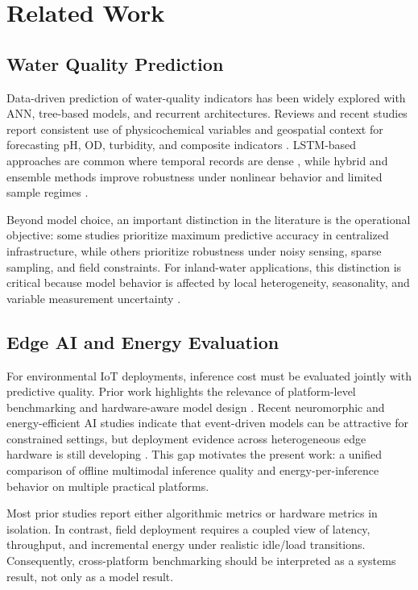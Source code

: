 \section{Related Work}

\subsection{Water Quality Prediction}
Data-driven prediction of water-quality indicators has been widely explored with ANN, tree-based models, and recurrent architectures. Reviews and recent studies report consistent use of physicochemical variables and geospatial context for forecasting pH, OD, turbidity, and composite indicators \cite{yan2024,ahmed2019,aladhaileh2021,pan2025}. LSTM-based approaches are common where temporal records are dense \cite{liu2019,pyo2023,qi2020}, while hybrid and ensemble methods improve robustness under nonlinear behavior and limited sample regimes \cite{wu2022,chadalavada2025,kalaivanan2022,palani2008}.

Beyond model choice, an important distinction in the literature is the operational objective: some studies prioritize maximum predictive accuracy in centralized infrastructure, while others prioritize robustness under noisy sensing, sparse sampling, and field constraints. For inland-water applications, this distinction is critical because model behavior is affected by local heterogeneity, seasonality, and variable measurement uncertainty \cite{yan2024,lowe2022,rahu2023}.

\subsection{Edge AI and Energy Evaluation}
For environmental IoT deployments, inference cost must be evaluated jointly with predictive quality. Prior work highlights the relevance of platform-level benchmarking and hardware-aware model design \cite{rosero2020,zulkifli2022,lamrini2024,elshafeiy2023}. Recent neuromorphic and energy-efficient AI studies indicate that event-driven models can be attractive for constrained settings, but deployment evidence across heterogeneous edge hardware is still developing \cite{aral2024,azadi2025,huijbregts2024,aribe2025future}. This gap motivates the present work: a unified comparison of offline multimodal inference quality and energy-per-inference behavior on multiple practical platforms.

Most prior studies report either algorithmic metrics or hardware metrics in isolation. In contrast, field deployment requires a coupled view of latency, throughput, and incremental energy under realistic idle/load transitions. Consequently, cross-platform benchmarking should be interpreted as a systems result, not only as a model result.
